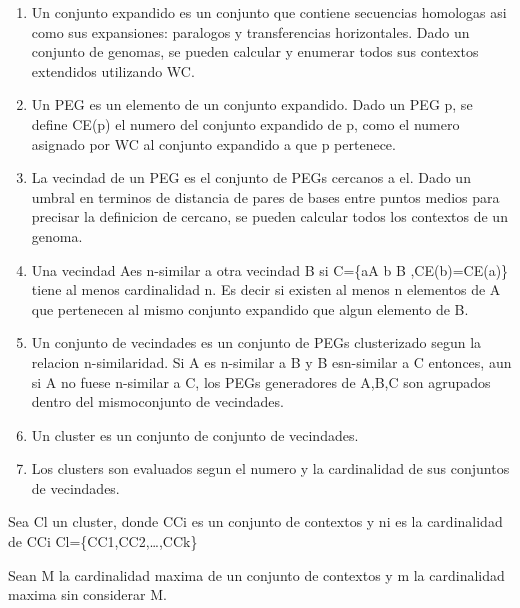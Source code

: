 \documentclass[12pt,twoside]{reedthesis}
\begin{document}
  \begin{enumerate}
  \def\labelenumi{\arabic{enumi}.}
  \item
    Un conjunto expandido es un conjunto que contiene secuencias homologas
    asi como sus expansiones: paralogos y transferencias horizontales.
    Dado un conjunto de genomas, se pueden calcular y enumerar todos sus
    contextos extendidos utilizando WC.
  \item
    Un PEG es un elemento de un conjunto expandido. Dado un PEG p, se
    define CE(p) el numero del conjunto expandido de p, como el numero
    asignado por WC al conjunto expandido a que p pertenece.
  \item
    La vecindad de un PEG es el conjunto de PEGs cercanos a el. Dado un
    umbral en terminos de distancia de pares de bases entre puntos medios
    para precisar la definicion de cercano, se pueden calcular todos los
    contextos de un genoma.
  \item
    Una vecindad Aes n-similar a otra vecindad B si C=\{aA \textbar{} b B
    ,CE(b)=CE(a)\} tiene al menos cardinalidad n. Es decir si existen al
    menos n elementos de A que pertenecen al mismo conjunto expandido que
    algun elemento de B.
  \item
    Un conjunto de vecindades es un conjunto de PEGs clusterizado segun la
    relacion n-similaridad. Si A es n-similar a B y B esn-similar a C
    entonces, aun si A no fuese n-similar a C, los PEGs generadores de
    A,B,C son agrupados dentro del mismoconjunto de vecindades.
  \item
    Un cluster es un conjunto de conjunto de vecindades.
  \item
    Los clusters son evaluados segun el numero y la cardinalidad de sus
    conjuntos de vecindades.
  \end{enumerate}
  
  Sea Cl un cluster, donde CCi es un conjunto de contextos y ni es la
  cardinalidad de CCi Cl=\{CC1,CC2,\ldots{},CCk\}
  
  Sean M la cardinalidad maxima de un conjunto de contextos y m la
  cardinalidad maxima sin considerar M.
  
  \begin{Shaded}
  \begin{Highlighting}[]
  \end{Highlighting}
  \end{Shaded}
  
\end{document}
